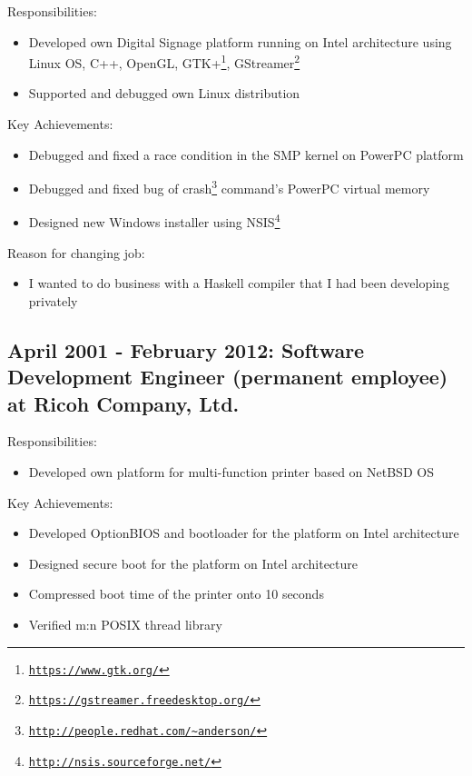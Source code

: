 \documentclass[letterpaper]{article}
\begin{document}
\noindent Responsibilities:

\begin{itemize}
  \item Developed own Digital Signage platform running on Intel architecture using Linux OS, C++, OpenGL, GTK+\footnote{\href{https://www.gtk.org/}{\tt https://www.gtk.org/}}, GStreamer\footnote{\href{https://gstreamer.freedesktop.org/}{\tt https://gstreamer.freedesktop.org/}}
  \item Supported and debugged own Linux distribution
\end{itemize}

\noindent Key Achievements:

\begin{itemize}
  \item Debugged and fixed a race condition in the SMP kernel on PowerPC platform
  \item Debugged and fixed bug of crash\footnote{\href{http://people.redhat.com/{\textasciitilde}anderson/}{\tt http://people.redhat.com/{\textasciitilde}anderson/}} command's PowerPC virtual memory
  \item Designed new Windows installer using NSIS\footnote{\href{http://nsis.sourceforge.net/}{\tt http://nsis.sourceforge.net/}}
\end{itemize}

\noindent Reason for changing job:

\begin{itemize}
  \item I wanted to do business with a Haskell compiler that I had been developing privately
\end{itemize}

\subsection*{April 2001 - February 2012: Software Development Engineer (permanent employee) at Ricoh Company, Ltd.}

\noindent Responsibilities:

\begin{itemize}
  \item Developed own platform for multi-function printer based on NetBSD OS
\end{itemize}

\noindent Key Achievements:

\begin{itemize}
  \item Developed OptionBIOS and bootloader for the platform on Intel architecture
  \item Designed secure boot for the platform on Intel architecture
  \item Compressed boot time of the printer onto 10 seconds
  \item Verified m:n POSIX thread library
\end{itemize}
\end{document}
